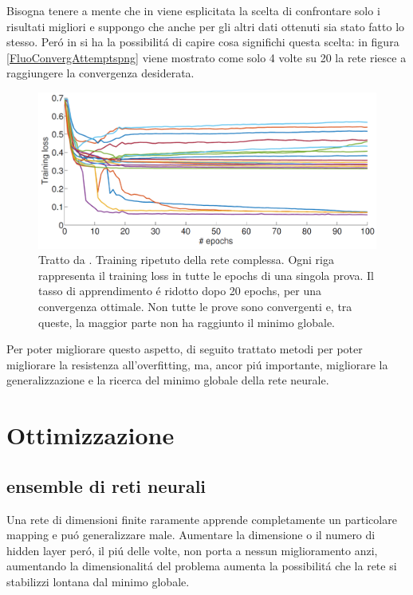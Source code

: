 \documentclass[a4paper,12pt]{report}
\begin{document}
 Bisogna tenere a mente che in \cite{guberman2016complex} viene esplicitata la scelta di confrontare solo i risultati migliori e suppongo che anche per gli altri dati ottenuti sia stato fatto lo stesso.
 Per\'o in \cite{guberman2016complex} si ha la possibilit\'a di capire cosa significhi questa scelta: in figura \ref{FluoConvergAttemptspng} viene mostrato come solo 4 volte su 20 la rete riesce a raggiungere la convergenza desiderata.
 \begin{figure}[h]
  \centering
  \includegraphics[scale=0.4]{FluoConvergAttempts.png}
  \caption{Tratto da \cite{guberman2016complex}. Training ripetuto della rete complessa. Ogni riga rappresenta il training loss in tutte le epochs di una singola prova. Il tasso di apprendimento \'e ridotto dopo 20 epochs, per una convergenza ottimale. Non tutte le prove sono convergenti e, tra queste, la maggior parte non ha raggiunto il minimo globale.}
 \end{figure}

 
 Per poter migliorare questo aspetto, di seguito trattato metodi per poter migliorare la resistenza all'overfitting, ma, ancor pi\'u importante, migliorare la generalizzazione e la ricerca del minimo globale della rete neurale.


 \chapter{Ottimizzazione}
 \section{ensemble di reti neurali}
 Una rete di dimensioni finite raramente apprende completamente un particolare mapping e pu\'o generalizzare male. 
 Aumentare la dimensione o il numero di hidden layer per\'o, il pi\'u delle volte, non porta a nessun miglioramento \cite{soulie1987evaluation} anzi, aumentando la dimensionalit\'a del problema aumenta la possibilit\'a che la rete si stabilizzi lontana dal minimo globale. 
 
\end{document}
